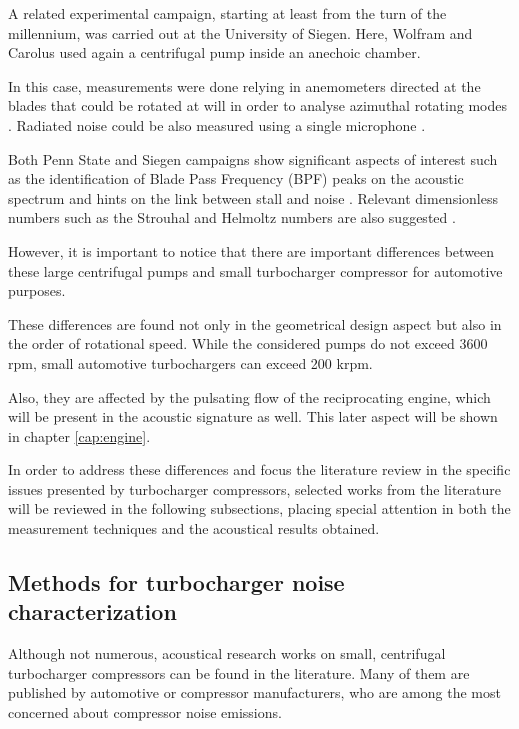 A related experimental campaign, starting at least from the turn of the millennium, was carried out at the University of Siegen. Here, Wolfram and Carolus \cite{wolfram2010experimental} used again a centrifugal pump inside an anechoic chamber. 

In this case, measurements were done relying in anemometers directed at the blades that could be rotated at will in order to analyse azimuthal rotating modes \cite{wolfram2009detection}. Radiated noise could be also measured using a single microphone \cite{carolus2000experimental}.

Both Penn State and Siegen campaigns show significant aspects of interest such as the identification of Blade Pass Frequency (BPF) peaks on the acoustic spectrum and hints on the link between stall and noise \cite{mongeau1993sound}. Relevant dimensionless numbers such as the Strouhal and Helmoltz numbers are also suggested \cite{mongeau1995method}. 

However, it is important to notice that there are important differences between these large centrifugal pumps and small turbocharger compressor for automotive purposes.

These differences are found not only in the geometrical design aspect but also in the order of rotational speed. While the considered pumps do not exceed 3600 rpm, small automotive turbochargers can exceed 200 krpm. 

Also, they are affected by the pulsating flow of the reciprocating engine, which will be present in the acoustic signature as well. This later aspect will be shown in chapter \ref{cap:engine}.

In order to address these differences and focus the literature review in the specific issues presented by turbocharger compressors, selected works from the literature will be reviewed in the following subsections, placing special attention in both the measurement techniques and the acoustical results obtained.

\subsection{Methods for turbocharger noise characterization}

Although not numerous, acoustical research works on small, centrifugal turbocharger compressors can be found in the literature. Many of them are published by automotive or compressor manufacturers, who are among the most concerned about compressor noise emissions.

